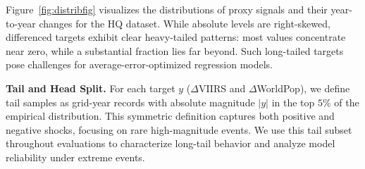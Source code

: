 \documentclass[pdflatex,sn-basic,Numbered]{sn-jnl}
\begin{document}
\begin{table}[htbp]
    \centering
    \caption{Target summary statistics (part 1)}
    \label{tab:tgsummarystat_1}
\end{table}
\vspace{-0.4cm}
\begin{table}[htbp]
    \centering
    \caption{Target summary statistics}
    \label{tab:tgsummarystat}
\end{table}

Figure~\ref{fig:distribfig} visualizes the distributions of proxy signals and their year-to-year changes for the HQ dataset. While absolute levels are right-skewed, differenced targets exhibit clear heavy-tailed patterns: most values concentrate near zero, while a substantial fraction lies far beyond. Such long-tailed targets pose challenges for average-error-optimized regression models.

\textbf{Tail and Head Split.} For each target $y$ ($\Delta$VIIRS and $\Delta$WorldPop), we define tail samples as grid-year records with absolute magnitude $|y|$ in the top $5\%$ of the empirical distribution. This symmetric definition captures both positive and negative shocks, focusing on rare high-magnitude events. We use this tail subset throughout evaluations to characterize long-tail behavior and analyze model reliability under extreme events.
\end{document}
